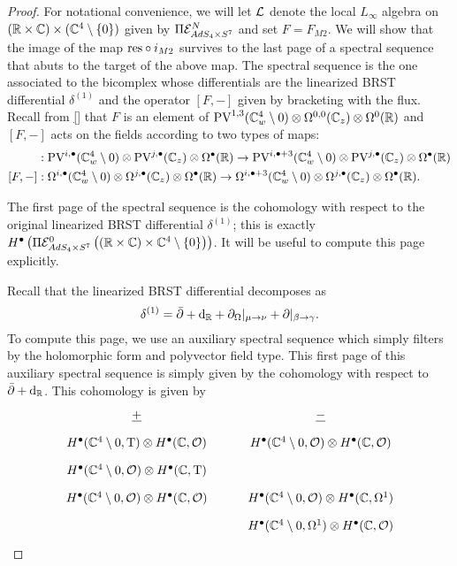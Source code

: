 \begin{proof}
For notational convenience, we will let $\mathcal{L}$ denote the local $L_\infty$ algebra on  $(\mathbb{R}\times \mathbb{C}) \times (\mathbb{C}^4\setminus \{0\} )$ given by $\Pi\mathcal{E}^N_{AdS_4\times S^7}$ and set $F = F_{M2}$. We will show that the image of the map $\mathrm{res}\circ i_{M2}$ survives to the last page of a spectral sequence that abuts to the target of the above map. The spectral sequence is the one associated to the bicomplex whose differentials are the linearized BRST differential $\delta^{(1)}$ and the operator $[F,- ]$ given by bracketing with the flux. Recall from \ref{} that $F$ is an element of  $\text{PV}^{1,3}(\mathbb{C}_w^4 \setminus 0) \otimes \Omega^{0,0}(\mathbb{C}_z) \otimes \Omega^0(\mathbb{R})$ and $[F,-]$ acts on the fields according to two types of maps:
\begin{align*}
[F ,-] & : \PV^{i,\bullet}(\C^4_w \setminus 0) \otimes \PV^{j,\bullet} (\C_z) \otimes \Omega^\bullet (\R) \to \PV^{i,\bullet+3}(\C^4_w \setminus 0) \otimes \PV^{j,\bullet} (\C_z) \otimes \Omega^\bullet (\R) \\
[F,-] & : \Omega^{i,\bullet}(\C^4_w \setminus 0) \otimes \Omega^{j,\bullet} (\C_z) \otimes \Omega^\bullet (\R) \to \Omega^{i,\bullet+3}(\C^4_w \setminus 0) \otimes \Omega^{j,\bullet} (\C_z) \otimes \Omega^\bullet (\R).
\end{align*}

The first page of the spectral sequence is the cohomology with respect to the original linearized BRST differential $\delta^{(1)}$; this is exactly $H^\bullet \left ( \Pi \mathcal{E}^0_{AdS_4\times S^7} \left ( (\mathbb{R}\times \mathbb{C}) \times \mathbb{C}^4\setminus \{0\} \right ) \right )$. It will be useful to compute this page explicitly.

Recall that the linearized BRST differential decomposes as
\[
\delta^{(1)} = \bar{\partial} + \mathrm{d}_{\mathbb{R}} + \partial_{\Omega} |_{\mu \to \nu} + \partial |_{\beta \to \gamma}  .
\]
To compute this page, we use an auxiliary spectral sequence which simply filters by the holomorphic form and polyvector field type. 
This first page of this auxiliary spectral sequence is simply given by the cohomology with respect to $\bar{\partial} + \mathrm{d}_{\mathbb{R}}$. 
This cohomology is given by
\begin{equation}
  \label{eqn:ads4ss} 
  \begin{tikzcd}[row sep = 1 ex]
    \ul{+} & \ul{-} \\
H^\bullet(\C^4\setminus 0, \T) \otimes H^\bullet(\C, \mc{O}) & H^\bullet(\C^4 \setminus 0, \mc{O}) \otimes H^\bullet(\C, \mc{O}) \\
H^\bullet(\C^4\setminus 0, \mc{O}) \otimes H^\bullet(\C, \T) \\
H^\bullet(\C^4\setminus 0, \mc{O}) \otimes H^\bullet(\C, \mc{O}) & H^\bullet(\C^4\setminus 0, \mc{O}) \otimes H^\bullet(\C, \Omega^1) \\ & H^\bullet(\C^4\setminus 0, \Omega^1) \otimes H^\bullet(\C, \mc{O})  
\end{tikzcd}
\end{equation}


\end{proof}
